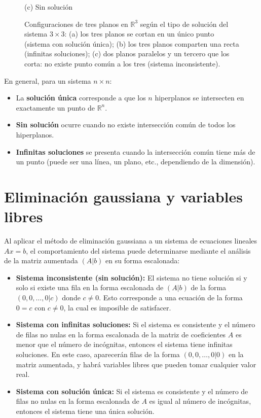 \begin{rem}
\begin{figure}[!htbp]
\begin{minipage}{0.32\textwidth}
\small (c) Sin solución
\end{minipage}
\caption{Configuraciones de tres planos en $\mathbb{R}^3$ según el tipo de solución del sistema $3\times 3$: (a) los tres planos se cortan en un único punto (sistema con solución única); (b) los tres planos comparten una recta (infinitas soluciones); (c) dos planos paralelos y un tercero que los corta: no existe punto común a los tres (sistema inconsistente).}
\label{fig:tresplanoscasos}
\end{figure}

En general, para un sistema $n \times n$:
\begin{itemize}
    \item La \textbf{solución única} corresponde a que los $n$ hiperplanos se intersecten en exactamente un punto de $\mathbb{R}^n$.
    \item \textbf{Sin solución} ocurre cuando no existe intersección común de todos los hiperplanos.
    \item \textbf{Infinitas soluciones} se presenta cuando la intersección común tiene más de un punto (puede ser una línea, un plano, etc., dependiendo de la dimensión).
\end{itemize}
\end{rem}
\section{Eliminación gaussiana y variables libres}

\begin{rem}
Al aplicar el método de eliminación gaussiana a un sistema de ecuaciones lineales $Ax = b$, el comportamiento del sistema puede determinarse mediante el análisis de la matriz aumentada $(A|b)$ en su forma escalonada:

\begin{itemize}
    \item \textbf{Sistema inconsistente (sin solución):} El sistema no tiene solución si y solo si existe una fila en la forma escalonada de $(A|b)$ de la forma $(0, 0, \ldots, 0 | c)$ donde $c \neq 0$. Esto corresponde a una ecuación de la forma $0 = c$ con $c \neq 0$, la cual es imposible de satisfacer.
    
    \item \textbf{Sistema con infinitas soluciones:} Si el sistema es consistente y el número de filas no nulas en la forma escalonada de la matriz de coeficientes $A$ es menor que el número de incógnitas, entonces el sistema tiene infinitas soluciones. En este caso, aparecerán filas de la forma $(0, 0, \ldots, 0 | 0)$ en la matriz aumentada, y habrá variables libres que pueden tomar cualquier valor real.
    
    \item \textbf{Sistema con solución única:} Si el sistema es consistente y el número de filas no nulas en la forma escalonada de $A$ es igual al número de incógnitas, entonces el sistema tiene una única solución.
\end{itemize}
\end{rem}

